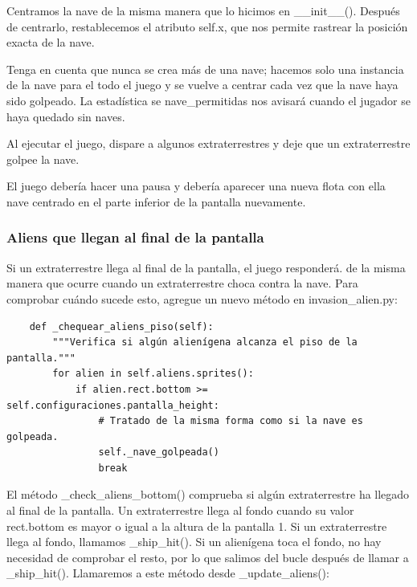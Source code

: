 Centramos la nave de la misma manera que lo hicimos en {\ttfamily\_\_init\_\_()}. Después de centrarlo,
restablecemos el atributo {\ttfamily self.x}, que nos permite rastrear la posición exacta de la nave.



Tenga en cuenta que nunca se crea más de una nave; hacemos solo una instancia de la nave para el
todo el juego y se vuelve a centrar cada vez que la nave haya sido golpeado.
La estadística se  {\ttfamily nave\_permitidas}
nos avisará cuando el jugador se haya quedado sin naves.

Al ejecutar el juego, dispare a algunos extraterrestres y deje que un extraterrestre golpee la nave. 

El juego debería hacer una pausa y debería aparecer una nueva flota con ella nave centrado en el
parte inferior de la pantalla nuevamente.

\subsubsection{Aliens que llegan al final de la pantalla} 

Si un extraterrestre llega al final de la pantalla, el juego responderá.
de la misma manera que ocurre cuando un extraterrestre choca contra la nave. Para comprobar cuándo sucede esto,
agregue un nuevo método en {\ttfamily invasion\_alien.py}:


\hspace{-2.4cm}{\ttfamily \scriptsize invasión}

\vspace{-0.2cm}
\hspace{-2.1cm}{\ttfamily \scriptsize \_alien.py}\vspace{-0.84cm}
\begin{lstlisting}
    def _chequear_aliens_piso(self):
        """Verifica si algún alienígena alcanza el piso de la pantalla."""
        for alien in self.aliens.sprites():
            if alien.rect.bottom >= self.configuraciones.pantalla_height:
                # Tratado de la misma forma como si la nave es golpeada.
                self._nave_golpeada()
                break
\end{lstlisting}


El método \_check\_aliens\_bottom() comprueba si algún extraterrestre ha llegado al final de la pantalla. Un extraterrestre llega al fondo cuando su valor rect.bottom es mayor o igual a la altura de la pantalla 1. Si un extraterrestre llega al fondo, llamamos \_ship\_hit(). Si un alienígena toca el fondo, no hay necesidad de comprobar el resto, por lo que salimos del bucle después de llamar a \_ship\_hit().
Llamaremos a este método desde \_update\_aliens():


